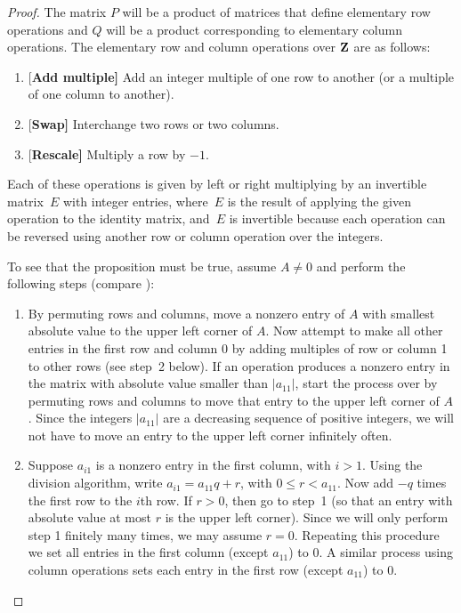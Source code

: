 \begin{proof}
  The matrix $P$ will be a product of matrices that define elementary
  row operations and $Q$ will be a product corresponding to elementary
  column operations.  The elementary row and column operations over
  $\mathbf{Z}$ are as follows:
\begin{enumerate}
\item{}{[\bf Add multiple]} Add an integer multiple of one row to another (or a multiple
of one column to another).
\item{}{[\bf Swap]} Interchange two rows or two columns.
\item{}{[\bf Rescale]} Multiply a row by $-1$.
\end{enumerate}
Each of these operations is given by left or right multiplying by an
invertible matrix~$E$ with integer entries, where~$E$ is the result of
applying the given operation to the identity matrix, and~$E$ is
invertible because each operation can be reversed using another row or
column operation over the integers.

To see that the proposition must be true, assume $A\neq 0$ and perform
the following steps (compare \cite[pg. 459]{artin:algebra}):
\begin{enumerate}
\item By permuting rows and columns, move a nonzero entry of $A$ with
smallest absolute value to the upper left corner of $A$.  Now attempt
to make all other entries in the first row and column $0$ by adding
multiples of row or column 1 to other rows (see step~2 below).  If an
operation produces a nonzero entry in the matrix with absolute value
smaller than $|a_{11}|$, start the process over by permuting rows and
columns to move that entry to the upper left corner of $A$.  Since the
integers $|a_{11}|$ are a decreasing sequence of positive integers, we
will not have to move an entry to the upper left corner infinitely
often.

\item Suppose $a_{i1}$ is a nonzero entry in the first column, with
$i>1$.  Using the division algorithm, write $a_{i1} = a_{11}q + r$,
with $0\leq r < a_{11}$.  Now add $-q$ times the first row to the
$i$th row.  If $r>0$, then go to step~1 (so that an entry with
absolute value at most $r$ is the upper left corner).  Since we will
only perform step 1 finitely many times, we may assume $r=0$.
Repeating this procedure we set all entries in the first column
(except $a_{11}$) to $0$.  A similar process using column operations
sets each entry in the first row (except $a_{11}$) to $0$.


\end{enumerate}
\end{proof}
